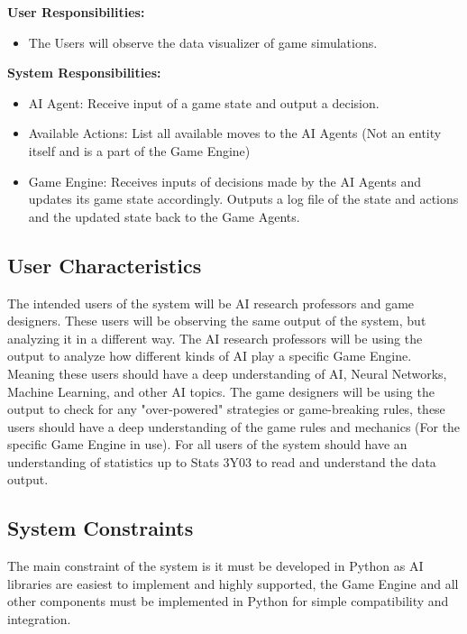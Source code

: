 \documentclass[12pt]{article}
\begin{document}
\textbf{User Responsibilities:}
\begin{itemize}
\item The Users will observe the data visualizer of game simulations. 
\end{itemize}


\textbf{System Responsibilities:}
\begin{itemize}
\item AI Agent: Receive input of a game state and output a decision. 
\item Available  Actions: List all available moves to the AI Agents (Not an entity itself and is a part of the Game Engine)
\item Game Engine: Receives inputs of decisions made by the AI Agents and updates its game state accordingly. Outputs a log file of the state and actions and the updated state back to the Game Agents.
\end{itemize}

\subsection{User Characteristics} \label{SecUserCharacteristics}
The intended users of the system will be AI research professors and game designers. These users will be observing the same output of the system, but analyzing it in a different way. The AI research professors will be using the output to analyze how different kinds of AI play a specific Game Engine. Meaning these users should have a deep understanding of AI, Neural Networks, Machine Learning, and other AI topics. The game designers will be using the output to check for any "over-powered" strategies or game-breaking rules, these users should have a deep understanding of the game rules and mechanics (For the specific Game Engine in use). For all users of the system should have an understanding of statistics up to Stats 3Y03 to read and understand the data output.

\subsection{System Constraints}
The main constraint of the system is it must be developed in Python as AI libraries are easiest to implement and highly supported, the Game Engine and all other components must be implemented in Python for simple compatibility and integration.
\end{document}
